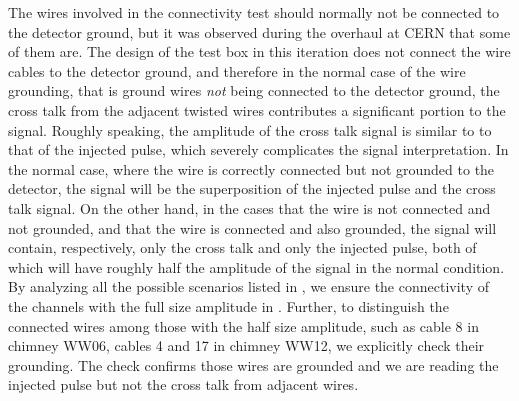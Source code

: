 The wires involved in the connectivity test should normally not be connected
to the detector ground, but it was observed during the
overhaul at CERN that some of them are.
The design of the test box in this iteration does not connect the wire cables
to the detector ground, and therefore in the normal case of the wire grounding,
that is ground wires \emph{not} being connected to the detector ground,
the cross talk from the adjacent twisted wires contributes a significant
portion to the signal.
Roughly speaking, the amplitude of the cross talk signal is similar to
to that of the injected pulse, which severely complicates the signal
interpretation.
In the normal case, where the wire is correctly connected but not grounded 
to the detector, the signal will be the superposition of the injected
pulse and the cross talk signal.
On the other hand, in the cases that the wire is not connected and not
grounded, and that the wire is connected and also grounded,
the signal will contain, respectively, only the cross talk and only the
injected pulse, both of which will have roughly half the amplitude of
the signal in the normal condition.
By analyzing all the possible scenarios listed in ,
we ensure the connectivity of the channels with the full size amplitude in
.
Further, to distinguish the connected wires among those with the half 
size amplitude, such as cable 8 in chimney WW06, cables 4 and 17 in chimney WW12,
we explicitly check their grounding.
The check confirms those wires are grounded and we are reading the injected
pulse but not the cross talk from adjacent wires.

